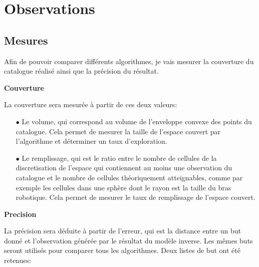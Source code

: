 \documentclass[11pt,french]{report}
\begin{document}
\chapter{Observations}

\section{Mesures}

Afin de pouvoir comparer différents algorithmes, je vais mesurer la couverture du catalogue réalisé ainsi que la précision du résultat.

\phantom{INVISIBLE LINE}

\textbf{Couverture}

\phantom{INVISIBLE LINE}

La couverture sera mesurée à partir de ces deux valeurs:

\begin{itemize}
    \item[$\bullet$] Le volume, qui correspond au volume de l'enveloppe convexe des points du catalogue.
    Cela permet de mesurer la taille de l'espace couvert par l'algorithme et déterminer un taux d'exploration.
    \item[$\bullet$] Le remplissage, qui est le ratio entre le nombre de cellules de la discretisation de l'espace qui contiennent au moins une observation du catalogue et le nombre de cellules théoriquement atteignables, comme par exemple les cellules dans une sphère dont le rayon est la taille du bras robotique.
    Cela permet de mesurer le taux de remplissage de l'espace couvert.
\end{itemize}

\phantom{INVISIBLE LINE}

\textbf{Precision}

\phantom{INVISIBLE LINE}

La précision sera déduite à partir de l'erreur, qui est la distance entre un but donné et l'observation générée par le résultat du modèle inverse.
Les mêmes buts seront utilisés pour comparer tous les algorithmes.
Deux listes de but ont été retenues:
\end{document}
